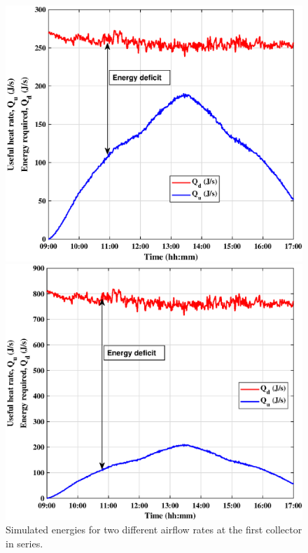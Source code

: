 \begin{figure}[ht!]
	\begin{minipage}{0.50\columnwidth}
		\includegraphics[scale=0.45]{figs/dry_low_1col.eps}
		
	\end{minipage}
	\begin{minipage}{0.50\columnwidth}
		\includegraphics[scale=0.45]{figs/dry_high_1col.eps}
		
	\end{minipage}
	\caption{Simulated energies for two different airflow rates at the first collector in series.}
	\label{dry_1col}
\end{figure}


